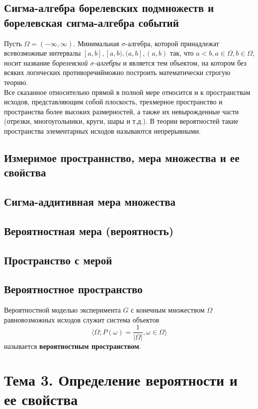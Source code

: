 \documentclass[12pt]{article}
\begin{document}
\subsection{Сигма-алгебра борелевских подмножеств и борелевская сигма-алгебра событий}
Пусть $\Omega = (-\infty, \infty)$. Минимальная $\sigma$-алгебра,
которой принадлежат всевозможные интервалы $[a, b], [a, b), (a, b], (a, b)$ так,
что $a < b, a \in \Omega, b \in \Omega$,
носит название \textit{борелевской $\sigma$-алгебры} и является тем объектом,
на котором без всяких логических противоречийможно построить математически строгую теорию. \\
Все сказанное относительно прямой в полной мере относится и к пространствам исходов,
представляющим собой плоскость, трехмерное пространство и пространства более высоких размерностей,
а также их невырожденные части (отрезки, многоугольники, круги, шары и т.д.).
В теории вероятностей такие пространства элементарных исходов называются непрерывными.

\subsection{Измеримое пространнство, мера множества и ее свойства}
\subsection{Сигма-аддитивная мера множества}
\subsection{Вероятностная мера (вероятность)}
\subsection{Пространство с мерой}
\subsection{Вероятностное пространство}
Вероятностной моделью эксперимента $G$ с конечным множеством $\Omega$
равновозможных исходов служит система объектов
\[\langle \Omega; P(\omega) = \frac{1}{|\Omega|}, \omega \in \Omega \rangle\]
называется \textbf{вероятностным пространством}.

\section{Тема 3. Определение вероятности и ее свойства}
\end{document}

